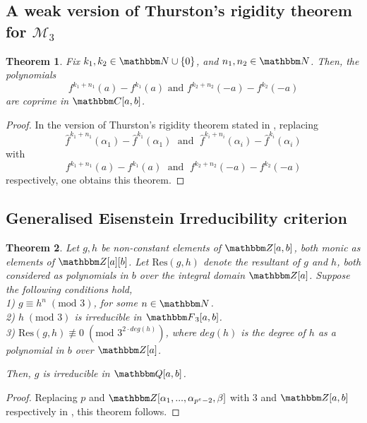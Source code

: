 \documentclass[reqno]{amsart}
\numberwithin{equation}{section}
\theoremstyle{plain}
\newtheorem{theorem}{Theorem}[section]
\theoremstyle{definition}
\theoremstyle{definition}
\newcommand{\Q}{{\mathbbm Q}}
\newcommand{\Z}{{\mathbbm Z}}
\newcommand{\C}{{\mathbbm C}}
\newcommand{\N}{{\mathbbm N}}
\newcommand{\F}{{\mathbbm F}}
\begin{document}
\subsection{A weak version of Thurston's rigidity theorem for $\mathcal{M}_{3}$}
    \begin{theorem}\label{thurs}
        Fix $k_{1},k_{2}\in \N \cup \{0\}$, and $n_{1},n_{2}\in \N$. Then, the polynomials 
        \begin{equation*}
            f^{k_{1}+n_{1}}(a) - f^{k_{1}}(a) \text{ and } f^{k_{2}+n_{2}}(-a) - f^{k_{2}}(-a)
        \end{equation*}
        are coprime in $\C[a,b]$.
    \end{theorem}
    \begin{proof}
        In the version of Thurston's rigidity theorem stated in \cite[Theorem~$4.4$]{Pat23}, replacing $$\hat{f}^{k_{1}+n_{1}}(\alpha_{1}) - \hat{f}^{k_{1}}(\alpha_{1})\;\text{ and }\; \hat{f}^{k_{i}+n_{i}}(\alpha_{i}) - \hat{f}^{k_{i}}(\alpha_{i})$$  with $$f^{k_{1}+n_{1}}(a) - f^{k_{1}}(a)\;\text{ and }\; f^{k_{2}+n_{2}}(-a) - f^{k_{2}}(-a)$$ respectively, one obtains this theorem.
    \end{proof}
\subsection{Generalised Eisenstein Irreducibility criterion}
    \begin{theorem}\label{m}
        Let $g,h$ be non-constant elements of $\Z[a,b]$, both monic as elements of $\Z[a][b]$. Let $\mbox{Res}(g,h)$ denote the resultant of $g$ and $h$, both considered as polynomials in $b$ over the integral domain $\Z[a]$. Suppose the following conditions hold,\\
        1) $g\equiv h^{n}\;(\text{mod } 3)$, for some $n\in \N$.\\
        2) $h\;(\text{mod } 3)$ is irreducible in $\F_{3}[a,b]$.\\
        3) $\mbox{Res}(g,h)\not\equiv 0\;(\text{mod }3^{2\cdot deg(h)})$, where $deg(h)$ is the degree of $h$ as a polynomial in $b$ over $\Z[a]$.
    
        Then, $g$ is irreducible in $\Q[a,b]$.
    \end{theorem}
    \begin{proof}
        Replacing $p$ and $\Z[\alpha_{1},...,\alpha_{p^{e}-2}, \beta]$ with $3$ and $\Z[a,b]$ respectively in \cite[Theorem~$4.6$]{Pat23}, this theorem follows.
    \end{proof}
\end{document}

